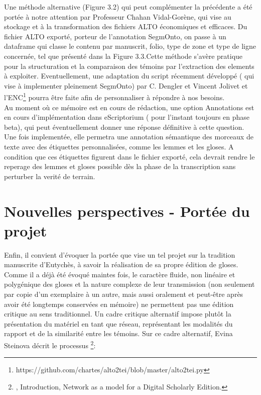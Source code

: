 \documentclass[a4paper, twoside, 12pt]{book}
\begin{document}
Une méthode alternative (Figure 3.2) qui peut complémenter la précédente a été portée à notre attention par Professeur Chahan Vidal-Gorène, qui vise au stockage et à la transformation des fichiers ALTO économiques et efficaces. Du fichier ALTO exporté, porteur de l'annotation SegmOnto, on passe à un dataframe qui classe le contenu par manuscrit, folio, type de zone et type de ligne concernée, tel que présenté dans la Figure 3.3.Cette méthode s'avère pratique pour la structuration et la comparaison des témoins par l'extraction des elements à exploiter. Eventuellement, une adaptation du script récemment  développé ( qui vise à implementer pleinement SegmOnto) par C. Dengler et Vincent Jolivet et l'ENC\footnote{ https://github.com/chartes/alto2tei/blob/master/alto2tei.py} pourra être faite afin de personnaliser à répondre à nos besoins. \\

Au moment où ce mémoire est en cours de rédaction, une option \og{} Annotations \fg{} est en cours d'implémentation dans eScriptorium ( pour l'instant toujours en phase beta), qui peut éventuellement donner une réponse définitive à cette question. Une fois implementée, elle permetra une annotation sémantique des morceaux de texte avec des étiquettes personnalisées, comme les lemmes et les gloses. A condition que ces étiquettes figurent dans le fichier exporté, cela devrait rendre le reperage des lemmes et gloses possible dès la phase de la transcription sans perturber la verité de terrain.


\section{Nouvelles perspectives - Portée du projet}

Enfin, il convient d'évoquer la portée que vise un tel projet sur la tradition manuscrite d'Eutychès, à savoir la réalisation de sa propre édition de gloses.
Comme il a déjà été évoqué maintes fois, le caractère fluide, non linéaire et polygénique des gloses et la nature complexe de leur transmission (non seulement par copie d'un exemplaire à un autre, mais aussi oralement et peut-être après avoir été longtemps conservées en mémoire) ne permettent pas une édition critique au sens traditionnel. Un cadre critique alternatif impose plutôt la présentation du matériel en tant que réseau, représentant les modalités du rapport et de la similarité entre les témoins. Sur ce cadre alternatif, Evina Steinova décrit le processus \footnote{\cite{steinova2021glosses}, Introduction, Network as a model for a Digital Scholarly Edition.}:
\end{document}
